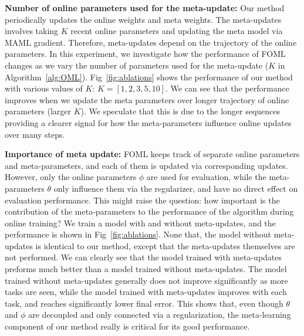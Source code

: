 \noindent \textbf{Number of online parameters used for the meta-update:} Our method periodically updates the online weights and meta weights. The meta-updates involves taking $K$ recent online parameters and updating the meta model via MAML gradient. Therefore, meta-updates depend on the trajectory of the online parameters. In this experiment, we investigate how the performance of FOML changes as we vary the number of parameters used for the meta-update ($K$ in Algorithm~\ref{alg:OML}). Fig~\ref{fig:ablations} shows the performance of our method with various values of $K$: $K=[1,2,3,5,10]$. We can see that the performance improves when we update the meta parameters over longer trajectory of online parameters (larger $K$). We speculate that this is due to the longer sequences providing a clearer signal for how the meta-parameters influence online updates over many steps.

\noindent \textbf{Importance of meta update:} FOML keeps track of separate online parameters and meta-parameters, and each of them is updated via corresponding updates. However, only the online parameters $\phi$ are used for evaluation, while the meta-parameters $\theta$ only influence them via the regularizer, and have no direct effect on evaluation performance. This might raise the question: how important is the contribution of the meta-parameters to the performance of the algorithm during online training? We train a model with and without meta-updates, and the performance is shown in Fig~\ref{fig:ablations}. None that, the model without meta-updates is identical to our method, except that the meta-updates themselves are not performed. We can clearly see that the model trained with meta-updates preforms much better than a model trained without meta-updates. The model trained without meta-updates generally does not improve significantly as more tasks are seen, while the model trained with meta-updates improves with each task, and reaches significantly lower final error. This shows that, even though $\theta$ and $\phi$ are decoupled and only connected via a regularization, the meta-learning component of our method really is critical for its good performance.


